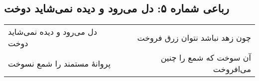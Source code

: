 \begin{center}
\section*{رباعی شماره ۵: دل می‌رود و دیده نمی‌شاید دوخت}
\label{sec:005}
\begin{longtable}{l p{0.5cm} r}
دل می‌رود و دیده نمی‌شاید دوخت
&&
چون زهد نباشد نتوان زرق فروخت
\\
پروانهٔ مستمند را شمع نسوخت
&&
آن سوخت که شمع را چنین می‌افروخت
\\
\end{longtable}
\end{center}
